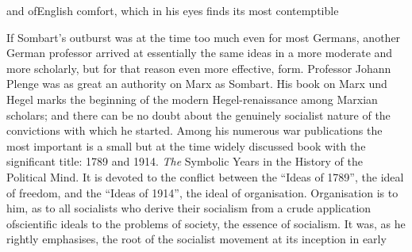 \documentclass[11pt,openany]{book}
\begin{document}
and ofEnglish comfort, which in his eyes finds its most contemptible

\begin{center}\textasteriskcentered\hspace{0.9em}\textasteriskcentered\hspace{0.9em}\textasteriskcentered\end{center}

\begin{center}\textasteriskcentered\hspace{0.9em}\textasteriskcentered\hspace{0.9em}\textasteriskcentered\end{center}

\begin{center}\textasteriskcentered\hspace{0.9em}\textasteriskcentered\hspace{0.9em}\textasteriskcentered\end{center}

\begin{center}\textasteriskcentered\hspace{0.9em}\textasteriskcentered\hspace{0.9em}\textasteriskcentered\end{center}

\begin{center}\textasteriskcentered\hspace{0.9em}\textasteriskcentered\hspace{0.9em}\textasteriskcentered\end{center}

If Sombart's outburst was at the time too much even for most Germans, another German professor arrived at essentially the same ideas in a more moderate and more scholarly, but for that reason even more effective, form. Professor Johann Plenge was as great an authority on Marx as Sombart. His book on Marx und Hegel marks the beginning of the modern Hegel-renaissance among Marxian scholars; and there can be no doubt about the genuinely socialist nature of the convictions with which he started. Among his numerous war publications the most important is a small but at the time widely discussed book with the significant title: 1789 and 1914. \emph{The} Symbolic Years in the History of the Political Mind. It is devoted to the conflict between the ``Ideas of 1789'', the ideal of freedom, and the ``Ideas of 1914'', the ideal of organisation. Organisation is to him, as to all socialists who derive their socialism from a crude application ofscientific ideals to the problems of society, the essence of socialism. It was, as he rightly emphasises, the root of the socialist movement at its inception in early
\end{document}
